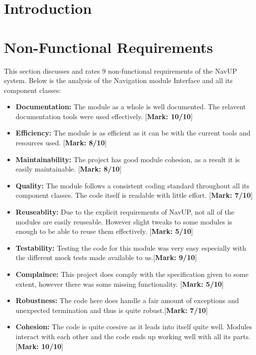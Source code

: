 \documentclass[runningheads,a4paper]{article}
\begin{document}
\newpage

\section{Introduction}

	\section{Non-Functional Requirements}
	
	This section discusses and rates 9 non-functional requirements of the NavUP system.
	Below is the analysis of the Navigation module Interface and all its component classes:
	
	\begin{itemize}
		\item \textbf{Documentation:}
			The module as a whole is well documented. The relavent documentation tools were used effectively. [\textbf{Mark: 10/10}]
			
		\item \textbf{Efficiency:} The module is as efficient as it can be with the current tools and resources used. [\textbf{Mark: 8/10}]
		
		\item \textbf{Maintainability:} The project has good module cohesion, as a result it is easily maintainable. [\textbf{Mark: 8/10}]
		
		\item \textbf{Quality:} The module follows a consistent coding standard throughout all its component classes. The code itself is readable with little effort. [\textbf{Mark: 7/10}]
		
		\item \textbf{Reuseablity:} Due to the explicit requirements of NavUP, not all of the modules are easily reuseable. However slight tweaks to some modules is enough to be able to reuse them effectively. [\textbf{Mark: 5/10}]
		
		\item \textbf{Testability:} Testing the code for this module was very easy especially with the different mock tests made available to us.[\textbf{Mark: 9/10}]
	
		\item \textbf{Complaince:} This project does comply with the specification given to some extent, however there was some missing functionality. [\textbf{Mark: 5/10}]
	
		\item \textbf{Robustness:} The code here does handle a fair amount of exceptions and unexpected termination and thus is quite robust.[\textbf{Mark: 7/10}]

		\item \textbf{Cohesion:} The code is quite coesive as it leads into itself quite well. Modules interact with each other and the code ends up working well with all its parts.[\textbf{Mark: 10/10}]\\

		
	\end{itemize}
	
	

\end{document}
